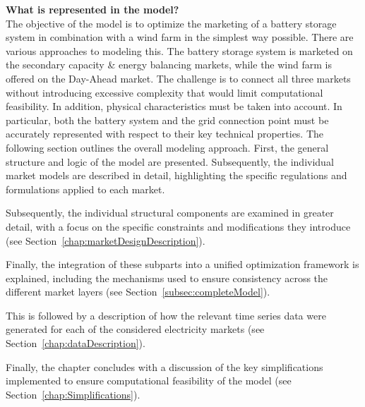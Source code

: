 \textbf{What is represented in the model?} \\

The objective of the model is to optimize the marketing of a battery storage system in combination with a wind farm in the simplest way possible.
There are various approaches to modeling this. The battery storage system is marketed on the secondary capacity \& energy balancing markets,
while the wind farm is offered on the Day-Ahead market.
The challenge is to connect all three markets without introducing excessive complexity that would limit computational feasibility.
In addition, physical characteristics must be taken into account.
In particular, both the battery system and the grid connection point
must be accurately represented with respect to their key technical properties.
The following section outlines the overall modeling approach.
First, the general structure and logic of the model are presented.
Subsequently, the individual market models are described in detail,
highlighting the specific regulations and formulations applied to each market.

Subsequently, the individual structural components are examined in greater detail,
with a focus on the specific constraints and modifications they introduce (see Section~\ref{chap:marketDesignDescription}).

Finally, the integration of these subparts into a unified optimization framework
is explained, including the mechanisms used to ensure consistency
across the different market layers (see Section~\ref{subsec:completeModel}).

This is followed by a description of how the relevant time series data
were generated for each of the considered electricity markets (see Section~\ref{chap:dataDescription}).

Finally, the chapter concludes with a discussion of the key simplifications
implemented to ensure computational feasibility of the model (see Section~\ref{chap:Simplifications}).

